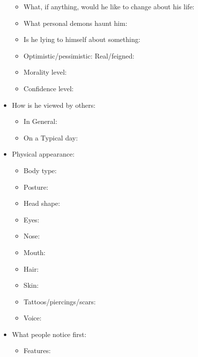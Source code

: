 \documentclass[openleft,oneside,showtrims]{memoir}
\begin{document}
\begin{itemize}
\begin{itemize}
\item What, if anything, would he like to change about his life:

\item What personal demons haunt him:

\item Is he lying to himself about something:

\item Optimistic/pessimistic: Real/feigned:

\item Morality level:

\item Confidence level:
\end{itemize}

\item How is he viewed by others:
\label{sec:org1aaeb15}

\begin{itemize}
\item In General:

\item On a Typical day:
\end{itemize}

\item Physical appearance:
\label{sec:org5ced16e}

\begin{itemize}
\item Body type:

\item Posture:

\item Head shape:

\item Eyes:

\item Nose:

\item Mouth:

\item Hair:

\item Skin:

\item Tattoos/piercings/scars:

\item Voice:
\end{itemize}

\item What people notice first:
\label{sec:org9d9b26e}

\begin{itemize}
\item Features:


\end{itemize}
\end{itemize}
\end{document}
